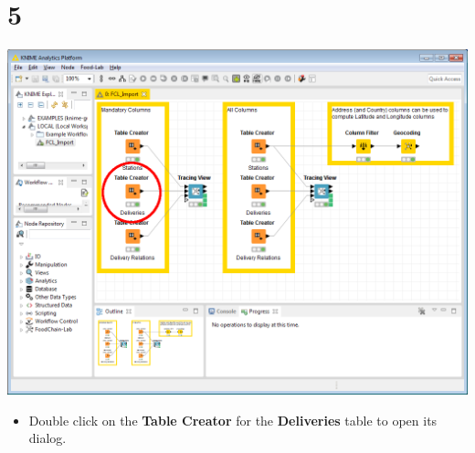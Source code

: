 \documentclass{beamer}
\begin{document}
\section{5}
\begin{frame}
	\begin{center}
  		\includegraphics[height=0.6\textheight]{5.png}
	\end{center}
	\begin{itemize}
		\item Double click on the \textbf{Table Creator} for the \textbf{Deliveries} table to open its dialog.
	\end{itemize}
\end{frame}
\end{document}
